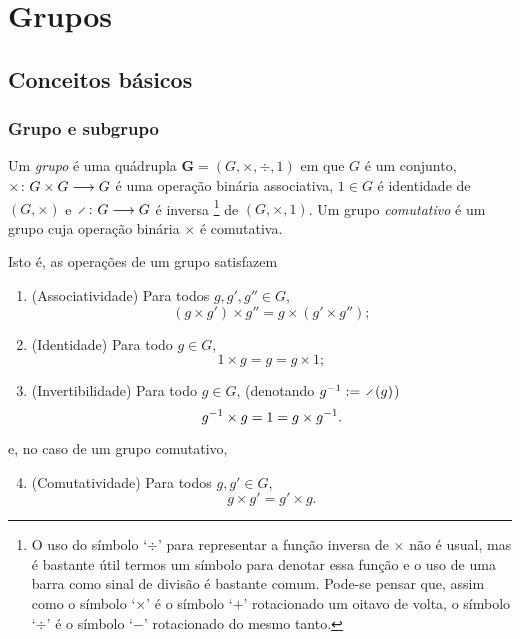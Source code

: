 \chapter{Grupos}

\section{Conceitos básicos}

\subsection{Grupo e subgrupo}


\begin{definition}
Um \emph{grupo} é uma quádrupla $\bm G=(G,\times,\div,1)$ em que $G$ é um conjunto, ${\times }\colon {G \times G} \longrightarrow {G}$ é uma operação binária associativa, $1 \in G$ é identidade de $(G,\times)$ e $\fun{\div}{G}{G}$ é inversa%
	\footnote{
	O uso do símbolo `$\div$' para representar a função inversa de $\times$ não é usual, mas é bastante útil termos um símbolo para denotar essa função e o uso de uma barra como sinal de divisão é bastante comum. Pode-se pensar que, assim como o símbolo `$\times$' é o símbolo `$+$' rotacionado um oitavo de volta, o símbolo `$\div$' é o símbolo `$-$' rotacionado do mesmo tanto.
	}
de $(G,\times,1)$. Um grupo \emph{comutativo} é um grupo cuja operação binária $\times$ é comutativa.
\end{definition}

Isto é, as operações de um grupo satisfazem
	\begin{enumerate}[label=\textbf{G\arabic*.},ref={G\arabic*}]
	\item \label{G1}(Associatividade) Para todos $g,g',g'' \in G$,
		\begin{equation*}
		(g \times g') \times g'' = g \times (g' \times g'');
		\end{equation*}
	\item \label{G2} (Identidade) Para todo $g \in G$,
		\begin{equation*}
		1 \times g = g =g \times 1;
		\end{equation*}
	\item \label{G3} (Invertibilidade) Para todo $g \in G$, (denotando $g\inv := \div(g)$)
		\begin{equation*}
		g^{-1} \times g = 1 = g \times g^{-1}.
		\end{equation*}
	\end{enumerate}
e, no caso de um grupo comutativo,
	\begin{enumerate}[label=\textbf{G\arabic*.},ref={G\arabic*}] \setcounter{enumi}{3}
	\item \label{G4} (Comutatividade) Para todos $g,g' \in G$,
		\begin{equation*}
		g \times g' = g' \times g.
		\end{equation*}
	\end{enumerate}

